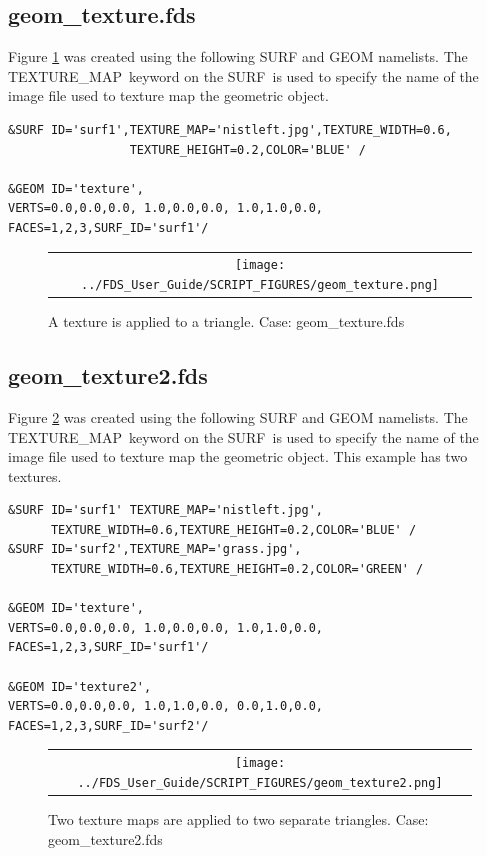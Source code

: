 \documentclass[11pt]{book}
\begin{document}
\subsection{geom\_texture.fds}
Figure \ref{fig:geom_texture} was created using the following SURF and GEOM namelists.
The {\ct TEXTURE\_MAP}\ keyword on the {\ct SURF}\ is used to specify the name of the image
file used to texture map the geometric object.

{\small
\begin{verbatim}
&SURF ID='surf1',TEXTURE_MAP='nistleft.jpg',TEXTURE_WIDTH=0.6,
                 TEXTURE_HEIGHT=0.2,COLOR='BLUE' /

&GEOM ID='texture',
VERTS=0.0,0.0,0.0, 1.0,0.0,0.0, 1.0,1.0,0.0,
FACES=1,2,3,SURF_ID='surf1'/
\end{verbatim}
}

\begin{figure}
\begin{center}
\begin{tabular}{c}
 \texttt{[image: ../FDS\_User\_Guide/SCRIPT\_FIGURES/geom\_texture.png]}
  \end{tabular}
\end{center}
 \caption{A texture is applied to a triangle. Case: geom\_texture.fds}
\label{fig:geom_texture}
\end{figure}

\subsection{geom\_texture2.fds}
Figure \ref{fig:geom_texture2} was created using the following SURF and GEOM namelists.
The {\ct TEXTURE\_MAP}\ keyword on the {\ct SURF}\ is used to specify the name of the image
file used to texture map the geometric object. This example has two textures.

{\small
\begin{verbatim}
&SURF ID='surf1' TEXTURE_MAP='nistleft.jpg',
      TEXTURE_WIDTH=0.6,TEXTURE_HEIGHT=0.2,COLOR='BLUE' /
&SURF ID='surf2',TEXTURE_MAP='grass.jpg',
      TEXTURE_WIDTH=0.6,TEXTURE_HEIGHT=0.2,COLOR='GREEN' /

&GEOM ID='texture',
VERTS=0.0,0.0,0.0, 1.0,0.0,0.0, 1.0,1.0,0.0,
FACES=1,2,3,SURF_ID='surf1'/

&GEOM ID='texture2',
VERTS=0.0,0.0,0.0, 1.0,1.0,0.0, 0.0,1.0,0.0,
FACES=1,2,3,SURF_ID='surf2'/
\end{verbatim}
}

\begin{figure}
\begin{center}
\begin{tabular}{c}
 \texttt{[image: ../FDS\_User\_Guide/SCRIPT\_FIGURES/geom\_texture2.png]}
  \end{tabular}
\end{center}
 \caption{Two texture maps are applied to two separate triangles.  Case: geom\_texture2.fds}
\label{fig:geom_texture2}
\end{figure}
\end{document}
